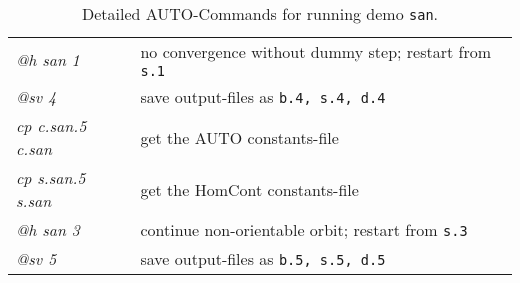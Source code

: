 \documentclass[12pt]{report}
\begin{document}
\begin{table}[htbp]
\begin{center}
\begin{tabular}{| l | l |}
  {\it @h san 1} & no convergence without dummy step; restart from {\tt s.1} \\ 
  {\it @sv 4} &  save output-files as {\tt b.4, s.4, d.4} \\ 
\hline
  {\it cp c.san.5 c.san} & get the AUTO constants-file \\ 
  {\it cp s.san.5 s.san} & get the HomCont constants-file \\
  {\it @h san 3} & continue non-orientable orbit; restart from {\tt s.3} \\
  {\it @sv 5} & save output-files as {\tt b.5, s.5, d.5} \\ 
\hline
\end{tabular}
\caption{Detailed {\cal AUTO}-Commands for running demo {\tt san}.}
\label{tbl:demo_san_1}
\end{center}
\end{table}
\end{document}
